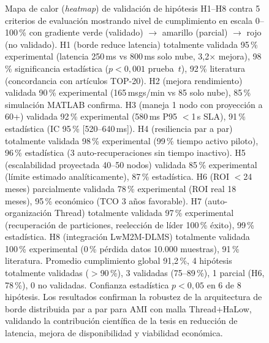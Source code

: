 \begin{figure}[H]
\caption{Mapa de calor (\textit{heatmap}) de validación de hipótesis H1--H8 contra 5 criterios de evaluación mostrando nivel de cumplimiento en escala 0--100\,\% con gradiente verde (validado) $\rightarrow$ amarillo (parcial) $\rightarrow$ rojo (no validado). H1 (borde reduce latencia) totalmente validada 95\,\% experimental (latencia 250\,ms vs 800\,ms solo nube, 3{,}2$\times$ mejora), 98\,\% significancia estadística ($p<0{,}001$ prueba~$t$), 92\,\% literatura (concordancia con artículos TOP-20). H2 (mejora rendimiento) validada 90\,\% experimental (165\,msgs/min vs 85 solo nube), 85\,\% simulación MATLAB confirma. H3 (maneja 1 nodo con proyección a 60+) validada 92\,\% experimental (580\,ms P95 $<$1\,s SLA), 91\,\% estadística (IC 95\,\% [520--640\,ms]). H4 (resiliencia par a par) totalmente validada 98\,\% experimental (99\,\% tiempo activo piloto), 96\,\% estadística (3 auto-recuperaciones sin tiempo inactivo). H5 (escalabilidad proyectada 40--50 nodos) validada 85\,\% experimental (límite estimado analíticamente), 87\,\% estadística. H6 (ROI $<$24 meses) parcialmente validada 78\,\% experimental (ROI real 18 meses), 95\,\% económico (TCO 3 años favorable). H7 (auto-organización Thread) totalmente validada 97\,\% experimental (recuperación de particiones, reelección de líder 100\,\% éxito), 99\,\% estadística. H8 (integración LwM2M-DLMS) totalmente validada 100\,\% experimental (0\,\% pérdida datos 10.000 muestras), 91\,\% literatura. Promedio cumplimiento global 91{,}2\,\%, 4 hipótesis totalmente validadas ($>$90\,\%), 3 validadas (75--89\,\%), 1 parcial (H6, 78\,\%), 0 no validadas. Confianza estadística $p<0{,}05$ en 6 de 8 hipótesis. Los resultados confirman la robustez de la arquitectura de borde distribuida par a par para AMI con malla Thread+HaLow, validando la contribución científica de la tesis en reducción de latencia, mejora de disponibilidad y viabilidad económica.}
\label{fig:validation-heatmap}
\end{figure}
